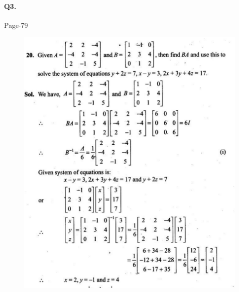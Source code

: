 \documentclass{article}
\begin{document}
\paragraph{Q3.}
\begin{flushright}
Page-79
\end{flushright}
\begin{figure}[H]
    \includegraphics[scale=0.5]{determinants_l3_ps_4.png}
\end{figure}

\clearpage
\end{document}
